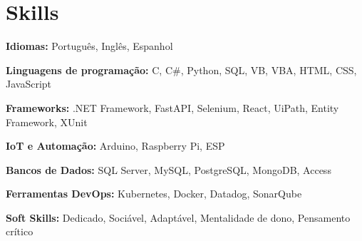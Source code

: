 \section{Skills}
	\begin{SkillHighlights} %
		\item \textbf{Idiomas:} Português, Inglês, Espanhol
		\item \textbf{Linguagens de programação:} C, C\#, Python, SQL, VB, VBA, HTML, CSS, JavaScript
		\item \textbf{Frameworks:} .NET Framework, FastAPI, Selenium, React, UiPath, Entity Framework, XUnit
		\item \textbf{IoT e Automação:} Arduino, Raspberry Pi, ESP
		
		\switchcolumn %

		\item \textbf{Bancos de Dados:} SQL Server, MySQL, PostgreSQL, MongoDB, Access
		\item \textbf{Ferramentas DevOps:} Kubernetes, Docker, Datadog, SonarQube
		\item \textbf{Soft Skills:} Dedicado, Sociável, Adaptável, Mentalidade de dono, Pensamento crítico
	\end{SkillHighlights}	